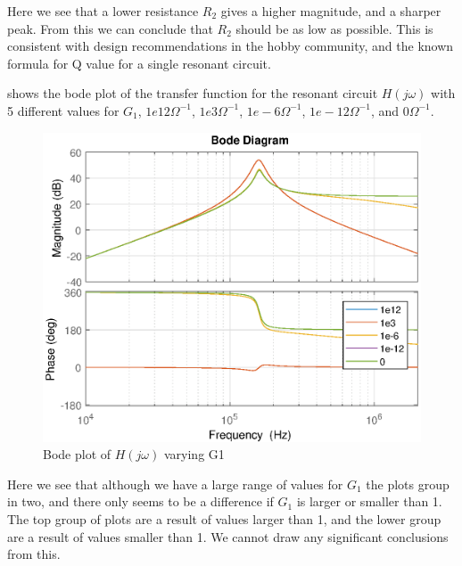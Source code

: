 Here we see that a lower resistance $R_2$ gives a higher magnitude, and a sharper peak. From this we can conclude that $R_2$ should be as low as possible. This is consistent with design recommendations in the hobby community, and the known formula for Q value for a single resonant circuit.

\newpage
{} shows the bode plot of the transfer function for the resonant circuit $H(j\omega)$ with 5 different values for $G_1$, $1e12{\Omega}^{-1}$, $1e3{\Omega}^{-1}$, $1e-6{\Omega}^{-1}$, $1e-12{\Omega}^{-1}$, and $0{\Omega}^{-1}$.

\begin{figure}[H]
    \centering
    \includegraphics[width=\textwidth]{img/CoilRigBode_G1.eps}
    \caption{Bode plot of $H(j\omega)$ varying G1}
    \label{fig:bode_g1}
\end{figure}

Here we see that although we have a large range of values for $G_1$ the plots group in two, and there only seems to be a difference if $G_1$ is larger or smaller than 1. The top group of plots are a result of values larger than 1, and the lower group are a result of values smaller than 1. We cannot draw any significant conclusions from this.

